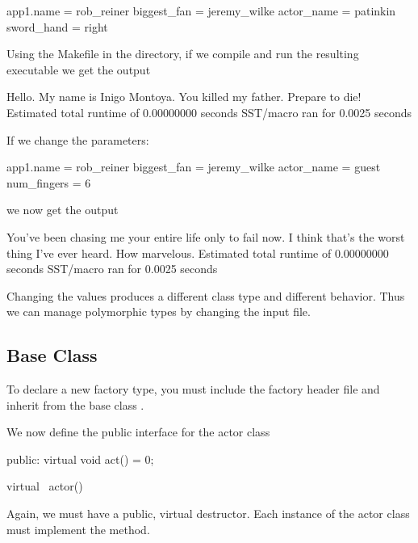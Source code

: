 \begin{ViFile}
app1.name = rob_reiner
biggest_fan = jeremy_wilke
actor_name = patinkin
sword_hand = right
\end{ViFile}

Using the Makefile in the directory, if we compile and run the resulting executable we get the output

\begin{ViFile}
Hello. My name is Inigo Montoya. You killed my father. Prepare to die!
Estimated total runtime of           0.00000000 seconds
SST/macro ran for       0.0025 seconds
\end{ViFile}

If we change the parameters:

\begin{ViFile}
app1.name = rob_reiner
biggest_fan = jeremy_wilke
actor_name = guest
num_fingers = 6
\end{ViFile}

we now get the output

\begin{ViFile}
You've been chasing me your entire life only to fail now.
I think that's the worst thing I've ever heard. How marvelous.
Estimated total runtime of           0.00000000 seconds
SST/macro ran for       0.0025 seconds
\end{ViFile}

Changing the values produces a different class type and different behavior.
Thus we can manage polymorphic types by changing the input file.

\subsection{Base Class}\label{subsec:baseClass}
To declare a new factory type, you must include the factory header file and inherit from the base class .

\begin{CppCode}
#include <sprockit/factories/factory.h>

namespace sstmac {
    namespace tutorial {

class actor
{
\end{CppCode}


We now define the public interface for the actor class

\begin{CppCode}
 public:
  virtual void
  act() = 0;

  virtual ~actor(){}
\end{CppCode}
Again, we must have a public, virtual destructor.
Each instance of the actor class must implement the  method.

